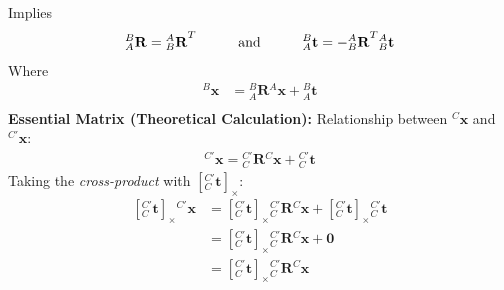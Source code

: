 \documentclass[a4paper,10pt]{article}
\newcommand{\spnhx}[1]{\ensuremath{{^{#1}}\mathbf{{x}}}}
\newcommand{\spppnhx}[3]{\ensuremath{{^{#1}_{#2}}\mathbf{{{#3}}}}}
\begin{document}
\noindent Implies %
\begin{equation*}
\begin{split}
\spppnhx{B}{A}{R}={\spppnhx{A}{B}{R}}^{T}
\indent\indent
\text{and}
\indent\indent
\spppnhx{B}{A}{t}= -{\spppnhx{A}{B}{R}}^{T}\spppnhx{A}{B}{t}\\
\end{split} 
\end{equation*}
\noindent Where
\begin{equation*}
\begin{split}
\spnhx{B} &= \spppnhx{B}{A}{R}\spnhx{A} + \spppnhx{B}{A}{t}\\
\end{split} 
\end{equation*}
\newline\noindent\newline\noindent
\newpage\noindent
\textbf{Essential Matrix (Theoretical Calculation):}
\newline\noindent\newline\noindent
Relationship between $^{C}\mathbf{x}$ and $^{C'}\mathbf{x}$:
\newline\noindent\newline\noindent
\begin{equation*}
\begin{split}
{^{C'}\mathbf{x}} = {\spppnhx{C'}{C}{R}}{^{C}\mathbf{x}}+{\spppnhx{C'}{C}{t}}
\end{split}
\end{equation*}
\newline\noindent\newline\noindent
Taking the \emph{cross-product} with $[\spppnhx{C'}{C}{t}]_{\times}$:
\newline\noindent\newline\noindent
\begin{equation*}
\begin{split}
{[\spppnhx{C'}{C}{t}]_{\times}}{^{C'}\mathbf{x}} &= 
{[\spppnhx{C'}{C}{t}]_{\times}}{\spppnhx{C'}{C}{R}}{^{C}\mathbf{x}}+
{[\spppnhx{C'}{C}{t}]_{\times}}{\spppnhx{C'}{C}{t}}\\
&={[\spppnhx{C'}{C}{t}]_{\times}}{\spppnhx{C'}{C}{R}}{^{C}\mathbf{x}}+\mathbf{0}\\
&={[\spppnhx{C'}{C}{t}]_{\times}}{\spppnhx{C'}{C}{R}}{^{C}\mathbf{x}}\\
\end{split}
\end{equation*}
\newline\noindent\newline\noindent
\end{document}
